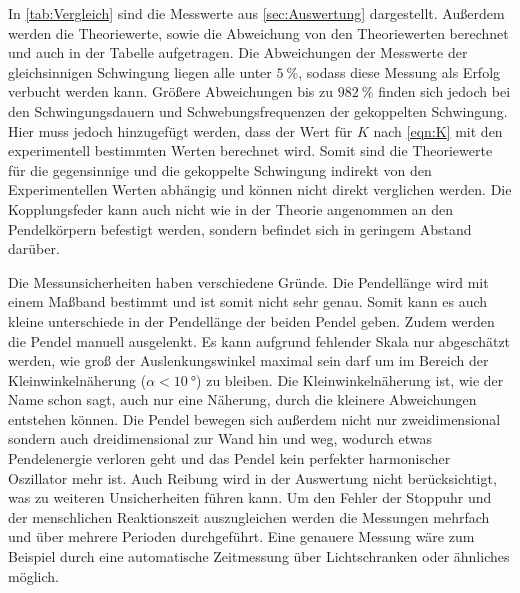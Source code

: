In \autoref{tab:Vergleich} sind die Messwerte aus \autoref{sec:Auswertung} dargestellt.
Außerdem werden die Theoriewerte, sowie die Abweichung von den Theoriewerten berechnet und auch in der Tabelle aufgetragen.
Die Abweichungen der Messwerte der gleichsinnigen Schwingung liegen alle unter $\qty{5}{\percent}$, sodass diese Messung als Erfolg verbucht werden kann.
Größere Abweichungen bis zu $\qty{982}{\percent}$ finden sich jedoch bei den Schwingungsdauern und Schwebungsfrequenzen der gekoppelten Schwingung.
Hier muss jedoch hinzugefügt werden, dass der Wert für $K$ nach \autoref{eqn:K} mit den experimentell bestimmten Werten berechnet wird.
Somit sind die Theoriewerte für die gegensinnige und die gekoppelte Schwingung indirekt von den Experimentellen Werten abhängig und können nicht 
direkt verglichen werden. Die Kopplungsfeder kann auch nicht wie in der Theorie angenommen an den Pendelkörpern befestigt werden, sondern befindet
sich in geringem Abstand darüber.


Die Messunsicherheiten haben verschiedene Gründe.
Die Pendellänge wird mit einem Maßband bestimmt und ist somit nicht sehr genau. Somit kann es auch kleine unterschiede in der Pendellänge der beiden 
Pendel geben.
Zudem werden die Pendel manuell ausgelenkt. Es kann aufgrund fehlender Skala nur abgeschätzt werden, wie groß der Auslenkungswinkel maximal sein darf um 
im Bereich der Kleinwinkelnäherung ($\alpha < \qty{10}{\degree}$) zu bleiben. Die Kleinwinkelnäherung ist, wie der Name schon sagt, auch nur eine Näherung,
durch die kleinere Abweichungen entstehen können.
Die Pendel bewegen sich außerdem nicht nur zweidimensional sondern auch dreidimensional zur Wand hin und weg, wodurch 
etwas Pendelenergie verloren geht und das Pendel kein perfekter harmonischer Oszillator mehr ist. 
Auch Reibung wird in der Auswertung nicht berücksichtigt, was zu weiteren Unsicherheiten führen kann.
Um den Fehler der Stoppuhr und der menschlichen Reaktionszeit auszugleichen werden die Messungen mehrfach und über mehrere Perioden durchgeführt.
Eine genauere Messung wäre zum Beispiel durch eine automatische Zeitmessung über Lichtschranken oder ähnliches möglich.



